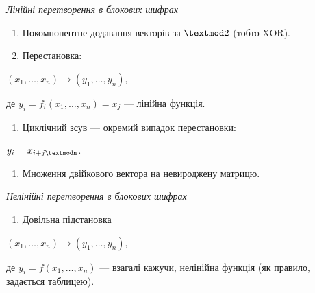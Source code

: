 {\centering\itshape
Лінійні перетворення в блокових шифрах
\par}


\bigskip

\liststyleWWviiiNumiii
\begin{enumerate}
\item Покомпонентне додавання векторів за  $\textmod2$ (тобто XOR).
\item Перестановка:
\end{enumerate}
{\centering
 ${(x_{1},\dots,x_{n})\rightarrow
(y_{1},\dots,y_{n})}$,
\par}

де  $y_{i}=f_{i}(x_{1},\dots,x_{n})=x_j$ ---
лінійна функція.

\liststyleWWviiiNumiii
\setcounter{saveenum}{\value{enumi}}
\begin{enumerate}
\setcounter{enumi}{\value{saveenum}}
\item Циклічний зсув  ---  окремий випадок перестановки:
\end{enumerate}
{\centering\itshape
 $y_{i}=x_{i+j\textmodn}$.
\par}

\liststyleWWviiiNumiii
\setcounter{saveenum}{\value{enumi}}
\begin{enumerate}
\setcounter{enumi}{\value{saveenum}}
\item Множення двійкового вектора на невироджену матрицю.
\end{enumerate}

\bigskip


\bigskip


\bigskip


\bigskip

{\centering\itshape
Нелінійні перетворення в блокових шифрах
\par}


\bigskip

\liststyleWWviiiNumxxxii
\begin{enumerate}
\item Довільна підстановка
\end{enumerate}
{\centering
 ${(x_{1},\dots,x_{n})\rightarrow
(y_{1},\dots,y_{n})}$,
\par}

де  $y_{i}=f(x_{1},\dots,x_n)$ --- взагалі кажучи,
нелінійна функція (як правило, задається таблицею).

